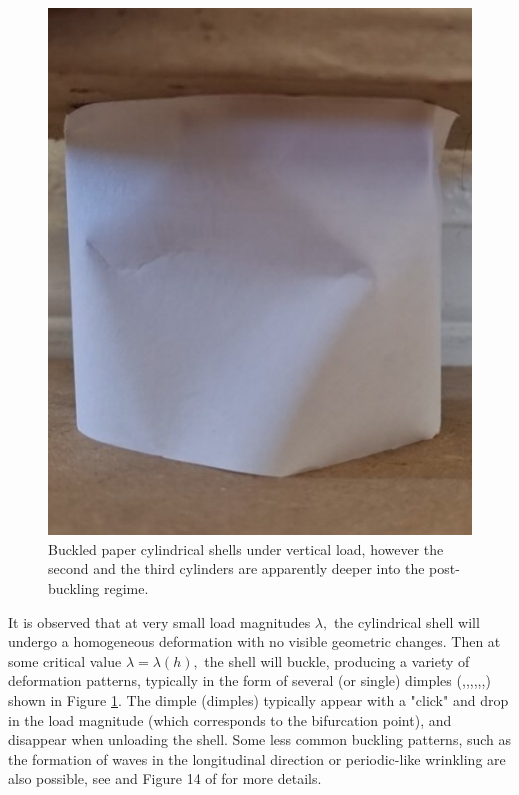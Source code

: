 \begin{figure}[!b]
  \includegraphics[scale=0.40]{figures/Buckling_3.jpg}\quad
  \caption{Buckled paper cylindrical shells under vertical load, however the second and the third cylinders are apparently deeper into the post-buckling regime.}
  \label{fig:paperCylinders}
\end{figure}

It is observed that at very small load magnitudes $\lambda,$ the cylindrical shell will undergo a homogeneous deformation with no visible geometric changes. Then at some critical value $\lambda=\lambda(h),$ the shell will buckle, producing a variety of deformation patterns, typically in the form of several (or single) dimples 
(\cite{bib:Yoshimura},\cite{bib:Bud.Hut.},\cite{bib:Bushnell},\cite{bib:Lan.Cal.Pal.},\cite{bib:Dog.Kli.Zim.Ode.Ara.},\cite{bib:Hor.Lor.Pel.},\cite{bib:Zhu.Man.Cal.}) 
shown in Figure \ref{fig:paperCylinders}. The dimple (dimples) typically appear with a "click" and drop in the load magnitude (which corresponds to the bifurcation point), and disappear when unloading the shell. Some less common buckling patterns, such as the formation of waves in the longitudinal direction or periodic-like wrinkling are also possible, see \cite{bib:Xu.Mic.} and Figure 14  of \cite{bib:Xu.Mic.} for more details.




